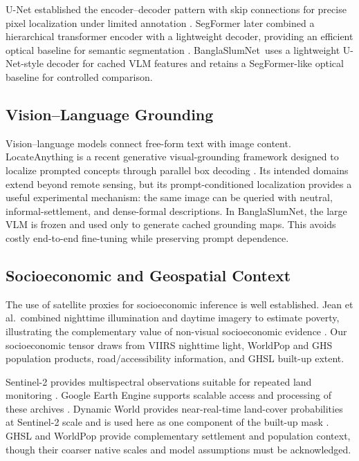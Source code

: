 \documentclass[11pt,a4paper]{article}
\newcommand{\project}{BanglaSlumNet}
\begin{document}
U-Net established the encoder--decoder pattern with skip connections for precise pixel localization under limited annotation \citep{ronneberger2015unet}. SegFormer later combined a hierarchical transformer encoder with a lightweight decoder, providing an efficient optical baseline for semantic segmentation \citep{xie2021segformer}. \project\ uses a lightweight U-Net-style decoder for cached VLM features and retains a SegFormer-like optical baseline for controlled comparison.

\subsection{Vision--Language Grounding}

Vision--language models connect free-form text with image content. LocateAnything is a recent generative visual-grounding framework designed to localize prompted concepts through parallel box decoding \citep{wang2026locateanything}. Its intended domains extend beyond remote sensing, but its prompt-conditioned localization provides a useful experimental mechanism: the same image can be queried with neutral, informal-settlement, and dense-formal descriptions. In \project, the large VLM is frozen and used only to generate cached grounding maps. This avoids costly end-to-end fine-tuning while preserving prompt dependence.

\subsection{Socioeconomic and Geospatial Context}

The use of satellite proxies for socioeconomic inference is well established. Jean et al.\ combined nighttime illumination and daytime imagery to estimate poverty, illustrating the complementary value of non-visual socioeconomic evidence \citep{jean2016poverty}. Our socioeconomic tensor draws from VIIRS nighttime light, WorldPop and GHS population products, road/accessibility information, and GHSL built-up extent.

Sentinel-2 provides multispectral observations suitable for repeated land monitoring \citep{drusch2012sentinel2}. Google Earth Engine supports scalable access and processing of these archives \citep{gorelick2017gee}. Dynamic World provides near-real-time land-cover probabilities at Sentinel-2 scale and is used here as one component of the built-up mask \citep{brown2022dynamicworld}. GHSL and WorldPop provide complementary settlement and population context, though their coarser native scales and model assumptions must be acknowledged.
\end{document}
